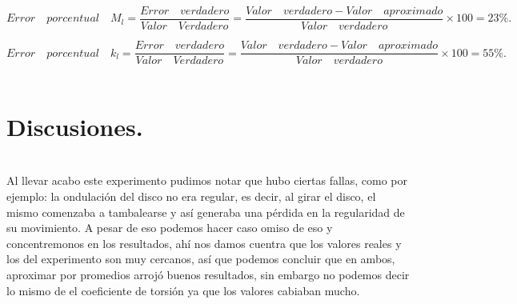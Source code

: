 \documentclass[10pt,a4paper]{article}
\begin{document}
\[{ E }rror\quad porcentual\quad { M }_{ l }=\frac { Error\quad verdadero }{ Valor\quad Verdadero } =\frac { Valor\quad verdadero - Valor\quad aproximado }{ Valor\quad verdadero } \times 100= 23\%. \]

\[{ E }rror\quad porcentual\quad { k }_{ l }=\frac { Error\quad verdadero }{ Valor\quad Verdadero } =\frac { Valor\quad verdadero - Valor\quad aproximado }{ Valor\quad verdadero } \times 100= 55\%. \]
\\
 \section*{Discusiones.}\\
Al llevar acabo este experimento pudimos notar que hubo ciertas fallas, como por ejemplo: la ondulaci\'{o}n del disco no era regular, es decir, al girar el disco, el mismo comenzaba a tambalearse y as\'{i} generaba una p\'{e}rdida en la regularidad de su movimiento. A pesar de eso podemos hacer caso omiso de eso y concentremonos en los resultados, ah\'{i} nos damos cuentra que los valores reales y los del experimento son muy cercanos, as\'{i} que podemos concluir que en ambos, aproximar por promedios arroj\'{o} buenos resultados, sin embargo no podemos decir lo mismo de el coeficiente de torsi\'{o}n ya que los valores cabiaban mucho.
\end{document}
